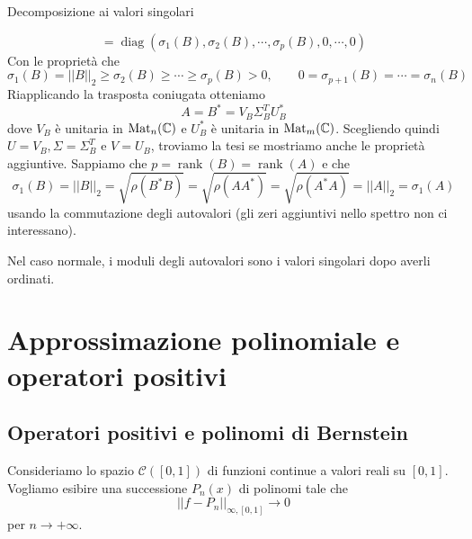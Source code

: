 \documentclass[a4paper]{article}
\begin{document}
\begin{snippetproof}{Decomposizione ai valori singolari}
\begin{itemize}
\[                = \operatorname{diag}(\sigma_1(B), \sigma_2(B), \cdots, \sigma_p(B), 0, \cdots, 0)
            \]
            Con le proprietà che
            \[
                \sigma_1(B) = ||B||_2
                \geq \sigma_2(B) \geq \cdots \geq \sigma_p(B) > 0,\qquad 0
                = \sigma_{p+1}(B) = \cdots = \sigma_n(B)
            \]
            Riapplicando la trasposta coniugata otteniamo
            \[
                A = B^* = V_B \Sigma_B^T U_B^*
            \]
            dove \(V_B\) è unitaria in \(\operatorname{Mat}_n(\mathbb{C})\)
            e \(U_B^*\) è unitaria in \(\operatorname{Mat}_m(\mathbb{C})\).
            Scegliendo quindi \(U = V_B, \Sigma = \Sigma_B^T\) e \(V = U_B\),
            troviamo la tesi se mostriamo anche le proprietà aggiuntive.
            Sappiamo che \(p = \operatorname{rank}(B) = \operatorname{rank}(A)\)
            e che \[
                \sigma_1(B) = ||B||_2 = \sqrt{\rho(B^*B)} =
                \sqrt{\rho(A A^*)} = \sqrt{\rho(A^*A)}
                = ||A||_2 = \sigma_1(A)
            \]
            usando la commutazione degli autovalori (gli zeri aggiuntivi nello spettro non ci interessano).
    \end{itemize}
\end{snippetproof}

Nel caso normale, i moduli degli autovalori sono i valori singolari
dopo averli ordinati.

\pagebreak

\section{Approssimazione polinomiale e operatori positivi}

\subsection{Operatori positivi e polinomi di Bernstein}

Consideriamo lo spazio \(\mathcal C([0,1])\)
di funzioni continue a valori reali su \([0,1]\).
Vogliamo esibire una successione \(P_n(x)\)
di polinomi tale che \[
    ||f-P_n||_{\infty, [0,1]} \to 0
\]
per \(n \to +\infty\).
\end{document}

